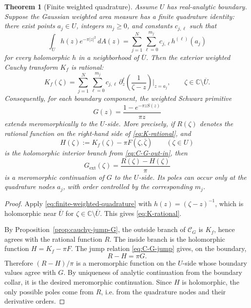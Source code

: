 \documentclass[11pt]{article}
\newtheorem{theorem}{Theorem}[section]
\newcommand{\C}{\mathbb C}
\newcommand{\dd}{\,d}
\newcommand{\1}{\mathbf 1}
\begin{document}
\begin{theorem}[Finite weighted quadrature]\label{thm:finite-weighted-G}
Assume \(U\) has real-analytic boundary. Suppose the Gaussian weighted area measure has a
finite quadrature identity: there exist points \(a_j\in U\), integers \(m_j\ge0\), and
constants \(c_{j,\ell}\) such that
\begin{equation}\label{eq:finite-weighted-quadrature}
  \int_U h(z)e^{-\pi|z|^2}\dd A(z)
  =
  \sum_{j=1}^N\sum_{\ell=0}^{m_j}c_{j,\ell}h^{(\ell)}(a_j)
\end{equation}
for every holomorphic \(h\) in a neighborhood of \(\overline U\). Then the exterior
weighted Cauchy transform \(K_f\) is rational:
\begin{equation}\label{eq:K-rational}
  K_f(\zeta)
  =
  \sum_{j=1}^N\sum_{\ell=0}^{m_j}
  c_{j,\ell}\,\partial_z^\ell\left(\frac{1}{\zeta-z}\right)\bigg|_{z=a_j},
  \qquad \zeta\in\C\setminus\overline U.
\end{equation}
Consequently, for each boundary component, the weighted Schwarz primitive
\[
  G(z)=\frac{1-e^{-\pi zS(z)}}{\pi z}
\]
extends meromorphically to the \(U\)-side. More precisely, if \(R(\zeta)\) denotes the
rational function on the right-hand side of \eqref{eq:K-rational}, and
\[
  H(\zeta):=K_f(\zeta)-\pi F(\zeta,\bar\zeta)
  \qquad (\zeta\in U)
\]
is the holomorphic interior branch from \eqref{eq:C-G-out-in}, then
\begin{equation}\label{eq:G-meromorphic-formula}
  G_{\mathrm{ext}}(\zeta)=\frac{R(\zeta)-H(\zeta)}{\pi}
\end{equation}
is a meromorphic continuation of \(G\) to the \(U\)-side. Its poles can occur only at the
quadrature nodes \(a_j\), with order controlled by the corresponding \(m_j\).
\end{theorem}

\begin{proof}
Apply \eqref{eq:finite-weighted-quadrature} with
\(h(z)=(\zeta-z)^{-1}\), which is holomorphic near \(\overline U\) for
\(\zeta\in\C\setminus\overline U\). This gives \eqref{eq:K-rational}.

By Proposition~\ref{prop:cauchy-jump-G}, the outside branch of \(\mathcal C_G\) is
\(K_f\), hence agrees with the rational function \(R\). The inside branch is the holomorphic
function \(H=K_f-\pi F\). The jump relation \eqref{eq:C-G-jump} gives, on the boundary,
\[
  R-H=\pi G.
\]
Therefore \((R-H)/\pi\) is a meromorphic function on the \(U\)-side whose boundary values
agree with \(G\). By uniqueness of analytic continuation from the boundary collar, it is
the desired meromorphic continuation. Since \(H\) is holomorphic, the only possible poles
come from \(R\), i.e. from the quadrature nodes and their derivative orders.
\end{proof}
\end{document}
